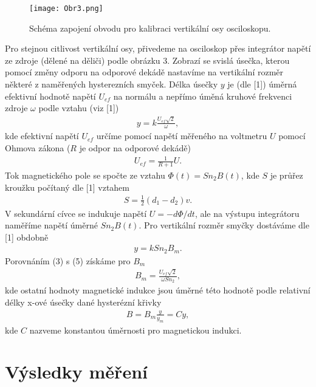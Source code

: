 \documentclass{article}
\begin{document}
\begin{figure}[h!]
\centering
\texttt{[image: Obr3.png]}
\caption{Schéma zapojení obvodu pro kalibraci vertikální osy osciloskopu.}
\end{figure}
\par Pro stejnou citlivost vertikální osy, přivedeme na osciloskop přes integrátor napětí ze zdroje (dělené na děliči) podle obrázku 3. Zobrazí se svislá úsečka, kterou pomocí změny odporu na odporové dekádě nastavíme na vertikální rozměr některé z naměřených hysterezních smyček. Délka úsečky $y$ je (dle [1]) úměrná efektivní hodnotě napětí $U_{ef}$ na normálu a nepřímo úměná kruhové frekvenci zdroje $\omega$ podle vztahu (viz [1])
\begin{align}
    y = k\frac{U_{ef} \sqrt{2}}{\omega},
\end{align}
kde efektivní napětí $U_{ef}$ určíme pomocí napětí měřeného na voltmetru $U$ pomocí Ohmova zákona ($R$ je odpor na odporové dekádě)
\begin{align}
    U_{ef} = \frac{1}{R+1}U.
\end{align}
Tok magnetického pole se spočte ze vztahu $\Phi(t) = Sn_2B(t)$, kde $S$ je průřez kroužku počítaný dle [1] vztahem
\begin{align}
    S = \frac{1}{2}(d_1 - d_2)v.
\end{align}
V sekundární cívce se indukuje napětí $U = -d\Phi/dt$, ale na výstupu integrátoru naměříme napětí úměrné $Sn_2B(t)$. Pro vertikální rozměr smyčky dostáváme dle [1] obdobně
\begin{align}
    y = kSn_2B_m.
\end{align}
Porovnáním (3) s (5) získáme pro $B_m$
\begin{align}
    B_m = \frac{U_{ef}\sqrt{2}}{\omega S n_2},
\end{align}
kde ostatní hodnoty magnetické indukce jsou úměrné této hodnotě podle relativní délky x-ové úsečky dané hysterézní křivky
\begin{align}
    B = B_m \frac{y}{y_m} = Cy,
\end{align}{}
kde $C$ nazveme konstantou úměrnosti pro magnetickou indukci.



\section{Výsledky měření}
\end{document}
